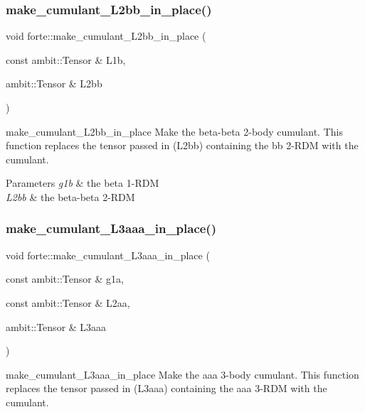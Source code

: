 \subsubsection{\texorpdfstring{make\+\_\+cumulant\+\_\+\+L2bb\+\_\+in\+\_\+place()}{make\_cumulant\_L2bb\_in\_place()}}
{\footnotesize\ttfamily void forte\+::make\+\_\+cumulant\+\_\+\+L2bb\+\_\+in\+\_\+place (\begin{DoxyParamCaption}\item[{const ambit\+::\+Tensor \&}]{L1b,  }\item[{ambit\+::\+Tensor \&}]{L2bb }\end{DoxyParamCaption})}



make\+\_\+cumulant\+\_\+\+L2bb\+\_\+in\+\_\+place Make the beta-\/beta 2-\/body cumulant. This function replaces the tensor passed in (L2bb) containing the bb 2-\/\+R\+DM with the cumulant. 


\begin{DoxyParams}{Parameters}
{\em g1b} & the beta 1-\/\+R\+DM \\
\hline
{\em L2bb} & the beta-\/beta 2-\/\+R\+DM \\
\hline
\end{DoxyParams}
\mbox{\label{namespaceforte_acd7d78b19b65ba13722d9cd5dd292be9}} 
\subsubsection{\texorpdfstring{make\+\_\+cumulant\+\_\+\+L3aaa\+\_\+in\+\_\+place()}{make\_cumulant\_L3aaa\_in\_place()}}
{\footnotesize\ttfamily void forte\+::make\+\_\+cumulant\+\_\+\+L3aaa\+\_\+in\+\_\+place (\begin{DoxyParamCaption}\item[{const ambit\+::\+Tensor \&}]{g1a,  }\item[{const ambit\+::\+Tensor \&}]{L2aa,  }\item[{ambit\+::\+Tensor \&}]{L3aaa }\end{DoxyParamCaption})}



make\+\_\+cumulant\+\_\+\+L3aaa\+\_\+in\+\_\+place Make the aaa 3-\/body cumulant. This function replaces the tensor passed in (L3aaa) containing the aaa 3-\/\+R\+DM with the cumulant. 


